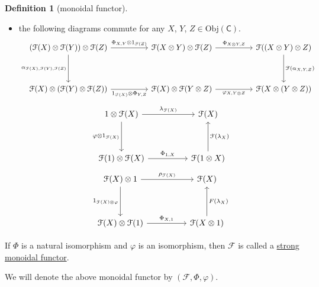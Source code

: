 \documentclass[a4paper,10pt]{scrreprt}
\newcommand{\defn}[1]{\ul{#1}}
\newcommand{\Obj}{\mathrm{Obj}}
\theoremstyle{definition}
\newtheorem{definition}{Definition}[section]
\theoremstyle{plain}
\theoremstyle{remark}
\begin{document}
\begin{definition}[monoidal functor]
\begin{itemize}
    \item the following diagrams commute for any $X$, $Y$, $Z \in \Obj(\mathsf{C})$.
      \begin{equation*}
        \begin{tikzcd}[row sep=huge, column sep=huge]
          (\mathcal{F}(X) \otimes \mathcal{F}(Y)) \otimes \mathcal{F}(Z)
          \arrow[r, "{\Phi_{X, Y} \otimes 1_{\mathcal{F}(Z)}}"]
          \arrow[d, swap, "\alpha_{\mathcal{F}(X), \mathcal{F}(Y), \mathcal{F}(Z)}"]
          & \mathcal{F}(X \otimes Y) \otimes \mathcal{F}(Z)
          \arrow[r, "{\Phi_{X \otimes Y, Z}}"]
          & \mathcal{F}((X \otimes Y) \otimes Z) 
          \arrow[d, "{\mathcal{F}(\alpha_{X, Y, Z})}"]
          \\
          \mathcal{F}(X) \otimes (\mathcal{F}(Y) \otimes \mathcal{F}(Z)) 
          \arrow[r, swap, "{1_{\mathcal{F}(X)} \otimes \Phi_{Y, Z}}"]
          & \mathcal{F}(X) \otimes \mathcal{F}(Y \otimes Z)
          \arrow[r, swap, "{\varphi_{X, Y \otimes Z}}"]
          & \mathcal{F}(X \otimes (Y \otimes Z))
        \end{tikzcd}
      \end{equation*}
      \begin{equation*}
        \begin{tikzcd}[row sep=huge, column sep=huge]
          1 \otimes \mathcal{F}(X)
          \arrow[r, "\lambda_{\mathcal{F}(X)}"]
          \arrow[d, swap, "\varphi \otimes 1_{\mathcal{F}(X)}"]
          & \mathcal{F}(X) 
          \\
          \mathcal{F}(1) \otimes \mathcal{F}(X)
          \arrow[r, "{\Phi_{1, X}}"]
          & \mathcal{F}(1 \otimes X)
          \arrow[u, swap, "\mathcal{F}(\lambda_{X})"]
        \end{tikzcd}
      \end{equation*}
      \begin{equation*}
        \begin{tikzcd}[row sep=huge, column sep=huge]
          \mathcal{F}(X) \otimes 1
          \arrow[r, "\rho_{\mathcal{F}(X)}"]
          \arrow[d, swap, "1_{\mathcal{F}(X)\otimes \varphi }"]
          & \mathcal{F}(X)
          \\
          \mathcal{F}(X) \otimes \mathcal{F}(1) 
          \arrow[r, "\Phi_{X, 1}"]
          & \mathcal{F}(X \otimes 1)
          \arrow[u, swap, "F(\lambda_{X})"]
        \end{tikzcd}
      \end{equation*}
  \end{itemize}

  If $\Phi$ is a natural isomorphism and $\varphi$ is an isomorphism, then $\mathcal{F}$ is called a \defn{strong monoidal functor}.

  We will denote the above monoidal functor by $(\mathcal{F}, \Phi, \varphi)$.
\end{definition}
\end{document}
